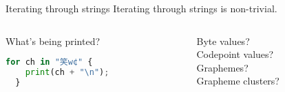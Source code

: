 \documentclass[../index.tex]{subfiles}
\begin{document}
\renewcommand{\currenttitle}{Iterating through strings}
\begin{frame}[fragile]{\currenttitle}
%
%
%
%
  Iterating through strings is non-trivial. \\[2em]

  \begin{columns}
    \begin{column}[t]{0.45\textwidth}
      What's being printed? \\[1em]

      \begin{lstlisting}[language=Python]
  for ch in "笑w¢" {
    print(ch + "\n");
  }
      \end{lstlisting}
    \end{column}

    \begin{column}[t]{0.45\textwidth}
      Byte values? \\
      Codepoint values? \\
      Graphemes? \\
      Grapheme clusters? \\
    \end{column}
  \end{columns}
\end{frame}
\end{document}
